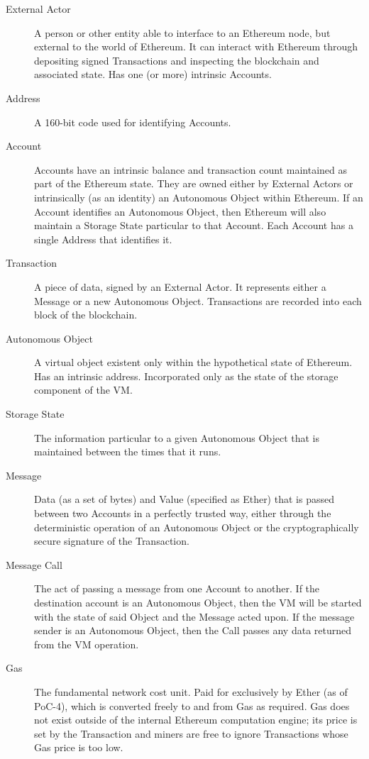 \documentclass[9pt,oneside]{amsart}
\begin{document}
\begin{description}
\item[External Actor] A person or other entity able to interface to an Ethereum node, but external to the world of Ethereum. It can interact with Ethereum through depositing signed Transactions and inspecting the blockchain and associated state. Has one (or more) intrinsic Accounts.

\item[Address] A 160-bit code used for identifying Accounts.

\item[Account] Accounts have an intrinsic balance and transaction count maintained as part of the Ethereum state. They are owned either by External Actors or intrinsically (as an identity) an Autonomous Object within Ethereum. If an Account identifies an Autonomous Object, then Ethereum will also maintain a Storage State particular to that Account. Each Account has a single Address that identifies it.

\item[Transaction] A piece of data, signed by an External Actor. It represents either a Message or a new Autonomous Object. Transactions are recorded into each block of the blockchain.

\item[Autonomous Object] A virtual object existent only within the hypothetical state of Ethereum.  Has an intrinsic address. Incorporated only as the state of the storage component of the VM.

\item[Storage State] The information particular to a given Autonomous Object that is maintained between the times that it runs.

\item[Message] Data (as a set of bytes) and Value (specified as Ether) that is passed between two Accounts in a perfectly trusted way, either through the deterministic operation of an Autonomous Object or the cryptographically secure signature of the Transaction.

\item[Message Call] The act of passing a message from one Account to another. If the destination account is an Autonomous Object, then the VM will be started with the state of said Object and the Message acted upon. If the message sender is an Autonomous Object, then the Call passes any data returned from the VM operation.

\item[Gas] The fundamental network cost unit. Paid for exclusively by Ether (as of PoC-4), which is converted freely to and from Gas as required. Gas does not exist outside of the internal Ethereum computation engine; its price is set by the Transaction and miners are free to ignore Transactions whose Gas price is too low.


\end{description}
\end{document}
